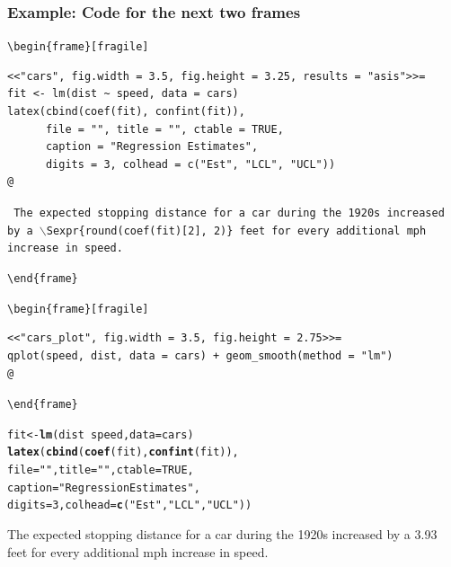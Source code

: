 \documentclass[t]{beamer}\usepackage[]{graphicx}\usepackage[]{color}
\makeatletter
\newcommand{\hlnum}[1]{\textcolor[rgb]{0.686,0.059,0.569}{#1}}%
\newcommand{\hlstr}[1]{\textcolor[rgb]{0.192,0.494,0.8}{#1}}%
\newcommand{\hlopt}[1]{\textcolor[rgb]{0,0,0}{#1}}%
\newcommand{\hlstd}[1]{\textcolor[rgb]{0.345,0.345,0.345}{#1}}%
\newcommand{\hlkwb}[1]{\textcolor[rgb]{0.69,0.353,0.396}{#1}}%
\newcommand{\hlkwc}[1]{\textcolor[rgb]{0.333,0.667,0.333}{#1}}%
\newcommand{\hlkwd}[1]{\textcolor[rgb]{0.737,0.353,0.396}{\textbf{#1}}}%
\newenvironment{kframe}{%
 \def\at@end@of@kframe{}%
 \ifinner\ifhmode%
  \def\at@end@of@kframe{\end{minipage}}%
  \begin{minipage}{\columnwidth}%
 \fi\fi%
 \def\FrameCommand##1{\hskip\@totalleftmargin \hskip-\fboxsep
 \colorbox{shadecolor}{##1}\hskip-\fboxsep
     \hskip-\linewidth \hskip-\@totalleftmargin \hskip\columnwidth}%
 \MakeFramed {\advance\hsize-\width
   \@totalleftmargin\z@ \linewidth\hsize
   \@setminipage}}%
 {\par\unskip\endMakeFramed%
 \at@end@of@kframe}
\makeatother
\begin{document}
\begin{frame}[fragile]
  \frametitle{Example: Code for the next two frames}
 
  \footnotesize
\verb;\begin{frame}[fragile];
\begin{verbatim}<<"cars", fig.width = 3.5, fig.height = 3.25, results = "asis">>=
fit <- lm(dist ~ speed, data = cars) 
latex(cbind(coef(fit), confint(fit)), 
      file = "", title = "", ctable = TRUE, 
      caption = "Regression Estimates", 
      digits = 3, colhead = c("Est", "LCL", "UCL"))
@ 
\end{verbatim}

{\tt 
The expected stopping distance for a car during the 1920s 
increased by a $\backslash$Sexpr\{round(coef(fit)[2], 2)\} 
feet for every additional mph increase in speed.} 

\verb;\end{frame};

\verb;\begin{frame}[fragile];
  \begin{verbatim}<<"cars_plot", fig.width = 3.5, fig.height = 2.75>>=
qplot(speed, dist, data = cars) + geom_smooth(method = "lm")
@
\end{verbatim}
\verb;\end{frame};
\end{frame}

\begin{frame}[fragile]
\begin{kframe}
\begin{alltt}
\hlstd{fit} \hlkwb{<-} \hlkwd{lm}\hlstd{(dist} \hlopt{~} \hlstd{speed,} \hlkwc{data} \hlstd{= cars)}
\hlkwd{latex}\hlstd{(}\hlkwd{cbind}\hlstd{(}\hlkwd{coef}\hlstd{(fit),} \hlkwd{confint}\hlstd{(fit)),}
      \hlkwc{file} \hlstd{=} \hlstr{""}\hlstd{,} \hlkwc{title} \hlstd{=} \hlstr{""}\hlstd{,} \hlkwc{ctable} \hlstd{=} \hlnum{TRUE}\hlstd{,}
      \hlkwc{caption} \hlstd{=} \hlstr{"Regression Estimates"}\hlstd{,}
      \hlkwc{digits} \hlstd{=} \hlnum{3}\hlstd{,} \hlkwc{colhead} \hlstd{=} \hlkwd{c}\hlstd{(}\hlstr{"Est"}\hlstd{,} \hlstr{"LCL"}\hlstd{,} \hlstr{"UCL"}\hlstd{))}
\end{alltt}
\end{kframe}%
%


  The expected stopping distance for a car during the 1920s increased by a
  3.93 feet for every additional mph increase in
  speed.
\end{frame}
\end{document}
